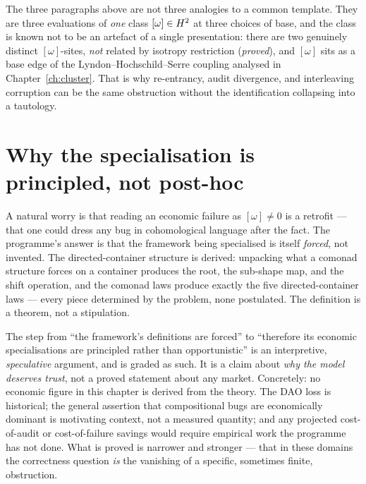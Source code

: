 \begin{remark}
The three paragraphs above are not three analogies to a common template. They are three
evaluations of \emph{one} class $[\omega]\in H^2$ at three choices of base, and the class
is known not to be an artefact of a single presentation: there are two genuinely distinct
$[\omega]$-sites, \emph{not} related by isotropy restriction (\emph{proved}), and $[\omega]$
sits as a base edge of the Lyndon--Hochschild--Serre coupling analysed in
Chapter~\ref{ch:cluster}. That is why re-entrancy, audit divergence, and interleaving
corruption can be the same obstruction without the identification collapsing into a
tautology.
\end{remark}

\section{Why the specialisation is principled, not post-hoc}
\label{sec:econ-principled}

A natural worry is that reading an economic failure as $[\omega]\neq0$ is a retrofit --- that
one could dress any bug in cohomological language after the fact. The programme's answer is
that the framework being specialised is itself \emph{forced}, not invented. The directed-container
structure is derived: unpacking what a comonad structure forces on a container produces the
root, the sub-shape map, and the shift operation, and the comonad laws produce exactly the
five directed-container laws --- every piece determined by the problem, none postulated. The
definition is a theorem, not a stipulation.

\begin{remark}
The step from ``the framework's definitions are forced'' to ``therefore its economic
specialisations are principled rather than opportunistic'' is an interpretive, \emph{speculative}
argument, and is graded as such. It is a claim about \emph{why the model deserves trust}, not a
proved statement about any market. Concretely: no economic figure in this chapter is derived
from the theory. The DAO loss is historical; the general assertion that compositional bugs are
economically dominant is motivating context, not a measured quantity; and any projected
cost-of-audit or cost-of-failure savings would require empirical work the programme has not
done. What is proved is narrower and stronger --- that in these domains the correctness
question \emph{is} the vanishing of a specific, sometimes finite, obstruction.
\end{remark}

